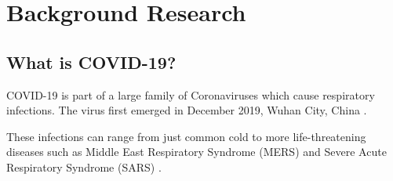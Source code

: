\section{Background Research}
  \citetrackerfalse

  \subsection{What is COVID-19?}
    \par COVID-19 is part of a large family of Coronaviruses which cause respiratory infections. The virus first emerged in December 2019, Wuhan City, China \parencite{HealthGovAU}.
    \par These infections can range from just common cold to more life-threatening diseases such as Middle East Respiratory Syndrome (MERS) and Severe Acute Respiratory Syndrome (SARS) \parencite{Q&A_WHO}.
  
